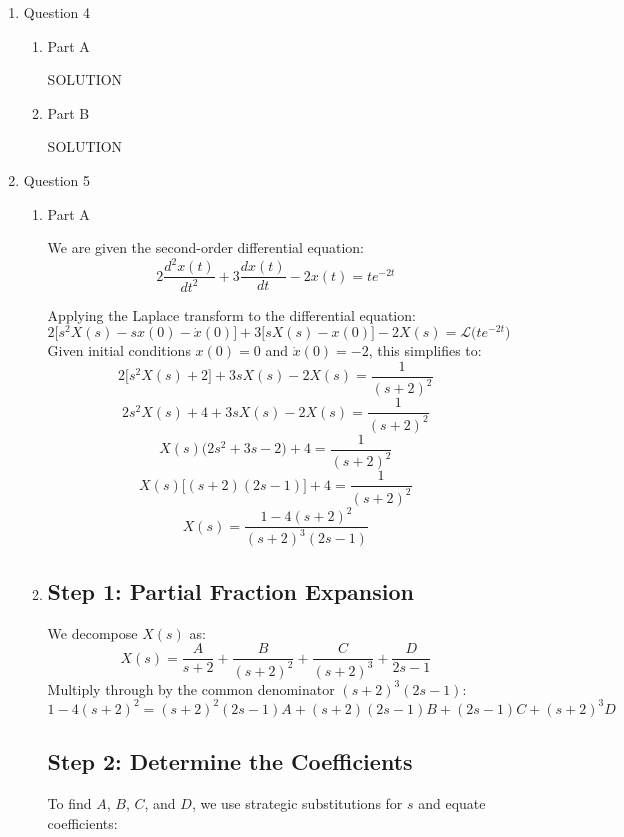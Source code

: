 \documentclass[12pt]{article}
\begin{document}
\begin{enumerate}
\item Question 4
  \begin{enumerate}
  \item Part A  %

  SOLUTION

  \item Part B  %

  SOLUTION
  \end{enumerate}
\newpage

\item Question 5
  \begin{enumerate}
  \item Part A  %

  We are given the second-order differential equation:
  \[
  2 \frac{d^2 x(t)}{dt^2} + 3 \frac{dx(t)}{dt} - 2 x(t) = t e^{-2t}
  \]

  Applying the Laplace transform to the differential equation:
  \[
  2 \big[ s^2 X(s) - s x(0) - \dot{x}(0) \big] + 3 \big[ s X(s) - x(0) \big] - 2 X(s) = \mathcal{L} \big( t e^{-2t} \big)
  \]
  Given initial conditions \( x(0) = 0 \) and \( \dot{x}(0) = -2 \), this simplifies to:
  \[
  2 \big[ s^2 X(s) + 2 \big] + 3 s X(s) - 2 X(s) = \frac{1}{(s + 2)^2}
  \]
  \[
  2 s^2 X(s) + 4 + 3 s X(s) - 2 X(s) = \frac{1}{(s + 2)^2}
  \]
  \[
  X(s) \big( 2 s^2 + 3 s - 2 \big) + 4 = \frac{1}{(s + 2)^2}
  \]
  \[
  X(s) \big[(s + 2) (2s - 1) \big] + 4 = \frac{1}{(s + 2)^2}
  \]
  \[
  X(s) = \frac{1 - 4 (s + 2)^2}{(s + 2)^3 (2s - 1)}
  \]

  \item

  \subsection*{Step 1: Partial Fraction Expansion}
  We decompose \( X(s) \) as:
  \[
  X(s) = \frac{A}{s + 2} + \frac{B}{(s + 2)^2} + \frac{C}{(s + 2)^3} + \frac{D}{2s - 1}
  \]
  Multiply through by the common denominator \( (s + 2)^3 (2s - 1) \):
  \[
  1 - 4 (s + 2)^2 = (s + 2)^2 (2s - 1) A + (s + 2) (2s - 1) B + (2s - 1) C + (s + 2)^3 D
  \]

  \subsection*{Step 2: Determine the Coefficients}
  To find \( A \), \( B \), \( C \), and \( D \), we use strategic substitutions for \( s \) and equate coefficients:


\end{enumerate}
\end{enumerate}
\end{document}
